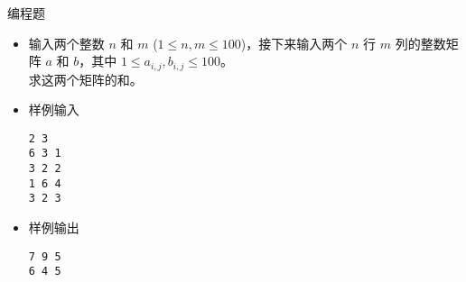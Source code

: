 \begin{frame}[fragile]
{\begin{exampleblock}{编程题}
            \begin{itemize}
                \item 输入两个整数 $n$ 和 $m$ ($1 \le n, m \le 100$)，接下来输入两个 $n$ 行 $m$ 列的整数矩阵 $a$ 和 $b$，其中 $1 \le a_{i,j},b_{i,j} \le 100$。\\
                    求这两个矩阵的和。

                \item 样例输入

                    \lstinline|2 3|\\
                    \lstinline|6 3 1|\\
                    \lstinline|3 2 2|\\
                    \lstinline|1 6 4|\\
                    \lstinline|3 2 3|

                \item 样例输出

                    \lstinline|7 9 5|\\
                    \lstinline|6 4 5|

            \end{itemize}

        \end{exampleblock}
    }
\end{frame}

